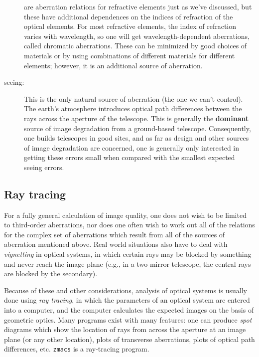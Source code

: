 \documentclass[12pt]{article}
\begin{document}
\begin{description}
        are aberration relations for refractive elements just as we've
        discussed, but these have additional dependences on the indices of
        refraction of the optical elements. For most refractive elements, the
        index of refraction varies with wavelength, so one will get
        wavelength-dependent aberrations, called chromatic aberrations. These
        can be minimized by good choices of materials or by using combinations
        of different materials for different elements; however, it is an
        additional source of aberration.
    \item [seeing:] This is the only natural source of aberration (the one we
        can't control). The earth's atmosphere introduces optical path
        differences between the rays across the aperture of the telescope. This
        is generally the \textbf{dominant} source of image degradation from a
        ground-based telescope. Consequently, one builds telescopes in good
        sites, and as far as design and other sources of image degradation are
        concerned, one is generally only interested in getting these errors
        small when compared with the smallest expected seeing errors.
\end{description}

\subsection{Ray tracing}
For a fully general calculation of image quality, one does not wish to be
limited to third-order aberrations, nor does one often wish to work out all of
the relations for the complex set of aberrations which result from all of the
sources of aberration mentioned above. Real world situations also have to deal
with \textit{vignetting} in optical systems, in which certain rays may be blocked
by something and never reach the image plane (e.g., in a two-mirror telescope,
the central rays are blocked by the secondary).

Because of these and other considerations, analysis of optical systems is
usually done using \textit{ray tracing}, in which the parameters of an optical
system are entered into a computer, and the computer calculates the expected
images on the basis of geometric optics. Many programs exist with many
features: one can produce \textit{spot} diagrams which show the location of
rays from across the aperture at an image plane (or any other location), plots
of transverse aberrations, plots of optical path differences, etc.
\texttt{zmacs} is a ray-tracing program.
\end{document}

